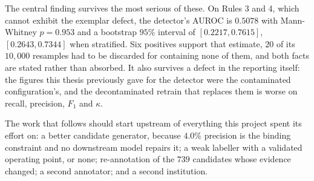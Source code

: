 The central finding survives the most serious of these. On Rules 3 and 4, which
cannot exhibit the exemplar defect, the detector's AUROC is $0.5078$ with
Mann-Whitney $p = 0.953$ and a bootstrap $95\%$ interval of $[0.2217, 0.7615]$,
$[0.2643, 0.7344]$ when stratified. Six positives support that estimate, $20$ of
its $10{,}000$ resamples had to be discarded for containing none of them, and
both facts are stated rather than absorbed. It also survives a defect in the
reporting itself: the figures this thesis previously gave for the detector were
the contaminated configuration's, and the decontaminated retrain that replaces
them is worse on recall, precision, $F_1$ and $\kappa$.

The work that follows should start upstream of everything this project spent its
effort on: a better candidate generator, because $4.0\%$ precision is the binding
constraint and no downstream model repairs it; a weak labeller with a validated
operating point, or none; re-annotation of the $739$ candidates whose evidence
changed; a second annotator; and a second institution.
